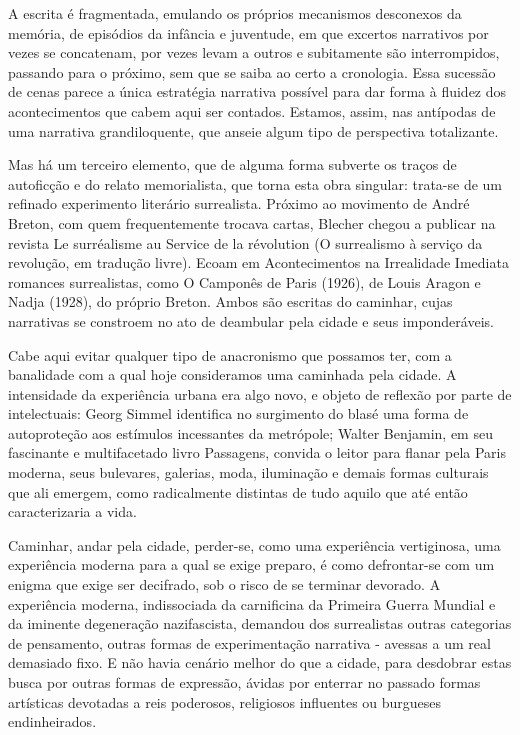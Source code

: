 A escrita é fragmentada, emulando os próprios mecanismos desconexos da memória, de episódios da infância e juventude, em que excertos narrativos por vezes se concatenam, por vezes levam a outros e subitamente são interrompidos, passando para o próximo, sem que se saiba ao certo a cronologia. Essa sucessão de cenas parece a única estratégia narrativa possível para dar forma à fluidez dos acontecimentos que cabem aqui ser contados. Estamos, assim, nas antípodas de uma narrativa grandiloquente, que anseie algum tipo de perspectiva totalizante. 

Mas há um terceiro elemento, que de alguma forma subverte os traços de autoficção e do relato memorialista, que torna esta obra singular: trata-se de um refinado experimento literário surrealista. Próximo ao movimento de André Breton, com quem frequentemente trocava cartas, Blecher chegou a publicar na revista Le surréalisme au Service de la révolution (O surrealismo à serviço da revolução, em tradução livre). Ecoam em Acontecimentos na Irrealidade Imediata romances surrealistas, como O Camponês de Paris (1926), de Louis Aragon e Nadja (1928), do próprio Breton. Ambos são escritas do caminhar, cujas narrativas se constroem no ato de deambular pela cidade e seus imponderáveis.

Cabe aqui evitar qualquer tipo de anacronismo que possamos ter, com a banalidade com a qual hoje consideramos uma caminhada pela cidade. A intensidade da experiência urbana era algo novo, e objeto de reflexão por parte de intelectuais: Georg Simmel identifica no surgimento do blasé uma forma de autoproteção aos estímulos incessantes da metrópole; Walter Benjamin, em seu fascinante e multifacetado livro Passagens, convida o leitor para flanar pela Paris moderna, seus bulevares, galerias, moda, iluminação e demais formas culturais que ali emergem, como radicalmente distintas de tudo aquilo que até então caracterizaria a vida.

Caminhar, andar pela cidade, perder-se, como uma experiência vertiginosa, uma experiência moderna para a qual se exige preparo, é como defrontar-se com um enigma que exige ser decifrado, sob o risco de se terminar devorado. A experiência moderna, indissociada da carnificina da Primeira Guerra Mundial e da iminente degeneração nazifascista, demandou dos surrealistas outras categorias de pensamento, outras formas de experimentação narrativa - avessas a um real demasiado fixo. E não havia cenário melhor do que a cidade, para desdobrar estas busca por outras formas de expressão, ávidas por enterrar no passado formas artísticas devotadas a reis poderosos, religiosos influentes ou burgueses endinheirados.


